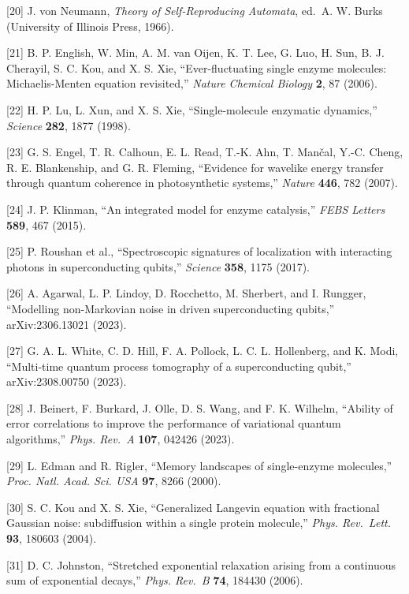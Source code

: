 \documentclass[
]{article}
\begin{document}
{[}20{]} J. von Neumann, \emph{Theory of Self-Reproducing Automata},
ed.~A. W. Burks (University of Illinois Press, 1966).

{[}21{]} B. P. English, W. Min, A. M. van Oijen, K. T. Lee, G. Luo, H.
Sun, B. J. Cherayil, S. C. Kou, and X. S. Xie, ``Ever-fluctuating single
enzyme molecules: Michaelis-Menten equation revisited,'' \emph{Nature
Chemical Biology} \textbf{2}, 87 (2006).

{[}22{]} H. P. Lu, L. Xun, and X. S. Xie, ``Single-molecule enzymatic
dynamics,'' \emph{Science} \textbf{282}, 1877 (1998).

{[}23{]} G. S. Engel, T. R. Calhoun, E. L. Read, T.-K. Ahn, T. Mančal,
Y.-C. Cheng, R. E. Blankenship, and G. R. Fleming, ``Evidence for
wavelike energy transfer through quantum coherence in photosynthetic
systems,'' \emph{Nature} \textbf{446}, 782 (2007).

{[}24{]} J. P. Klinman, ``An integrated model for enzyme catalysis,''
\emph{FEBS Letters} \textbf{589}, 467 (2015).

{[}25{]} P. Roushan et al., ``Spectroscopic signatures of localization
with interacting photons in superconducting qubits,'' \emph{Science}
\textbf{358}, 1175 (2017).

{[}26{]} A. Agarwal, L. P. Lindoy, D. Rocchetto, M. Sherbert, and I.
Rungger, ``Modelling non-Markovian noise in driven superconducting
qubits,'' arXiv:2306.13021 (2023).

{[}27{]} G. A. L. White, C. D. Hill, F. A. Pollock, L. C. L. Hollenberg,
and K. Modi, ``Multi-time quantum process tomography of a
superconducting qubit,'' arXiv:2308.00750 (2023).

{[}28{]} J. Beinert, F. Burkard, J. Olle, D. S. Wang, and F. K. Wilhelm,
``Ability of error correlations to improve the performance of
variational quantum algorithms,'' \emph{Phys. Rev.~A} \textbf{107},
042426 (2023).

{[}29{]} L. Edman and R. Rigler, ``Memory landscapes of single-enzyme
molecules,'' \emph{Proc. Natl. Acad. Sci. USA} \textbf{97}, 8266 (2000).

{[}30{]} S. C. Kou and X. S. Xie, ``Generalized Langevin equation with
fractional Gaussian noise: subdiffusion within a single protein
molecule,'' \emph{Phys. Rev.~Lett.} \textbf{93}, 180603 (2004).

{[}31{]} D. C. Johnston, ``Stretched exponential relaxation arising from
a continuous sum of exponential decays,'' \emph{Phys. Rev.~B}
\textbf{74}, 184430 (2006).
\end{document}
